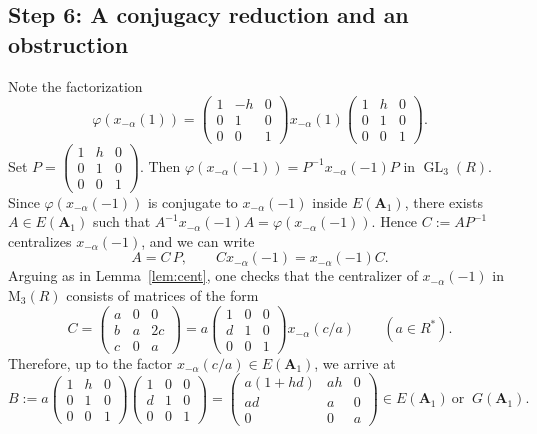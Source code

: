 \documentclass[]{jgcc}
\DeclareMathOperator{\GL}{GL}
\numberwithin{equation}{section}
\begin{document}
\subsection*{Step 6: A conjugacy reduction and an obstruction}
Note the factorization
\[
\varphi (x_{-\alpha}(1))=
\begin{pmatrix}
1& -h& 0\\
0& 1& 0\\
0& 0& 1
\end{pmatrix}
x_{-\alpha}(1)
\begin{pmatrix}
1& h& 0\\
0& 1& 0\\
0& 0& 1
\end{pmatrix}.
\]
Set $P=\begin{pmatrix}1&h&0\\0&1&0\\0&0&1\end{pmatrix}$.
Then $\varphi(x_{-\alpha}(-1))=P^{-1}x_{-\alpha}(-1)P$ in $\GL_3(R)$.
Since $\varphi(x_{-\alpha}(-1))$ is conjugate to $x_{-\alpha}(-1)$ inside $E(\mathbf A_1)$,
there exists $A\in E(\mathbf A_1)$ such that
$A^{-1}x_{-\alpha}(-1)A=\varphi(x_{-\alpha}(-1))$.
Hence $C:=AP^{-1}$ centralizes $x_{-\alpha}(-1)$, and we can write
\[
A=C\,P,\qquad Cx_{-\alpha}(-1)=x_{-\alpha}(-1)C.
\]
Arguing as in Lemma~\ref{lem:cent}, one checks that the centralizer of $x_{-\alpha}(-1)$ in $\mathrm{M}_3(R)$
consists of matrices of the form
\[
C=\begin{pmatrix}
a& 0& 0\\
b& a& 2c\\
c& 0& a
\end{pmatrix}
=a\begin{pmatrix}
1& 0& 0\\
d& 1& 0\\
0& 0& 1
\end{pmatrix}x_{-\alpha}(c/a)
\qquad(a\in R^*).
\]
Therefore, up to the factor $x_{-\alpha}(c/a)\in E(\mathbf A_1)$, we arrive at
\[
B:=a\begin{pmatrix}
1& h& 0\\
0& 1& 0\\
0& 0& 1
\end{pmatrix}
\begin{pmatrix}
1& 0& 0\\
d& 1& 0\\
0& 0& 1
\end{pmatrix}
=
\begin{pmatrix}
a(1+hd)& ah& 0\\
ad& a& 0\\
0& 0& a
\end{pmatrix}\in E(\mathbf A_1)\ \text{or }\ G(\mathbf A_1).
\]
\end{document}
